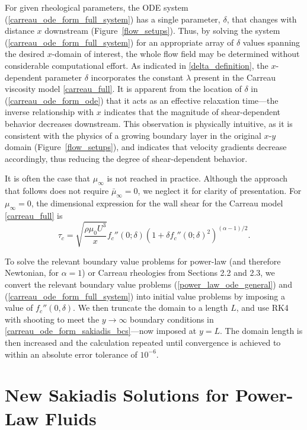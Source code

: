 \documentclass{article}
\begin{document}
For given rheological parameters, the ODE system (\ref{carreau_ode_form_full_system}) has a single parameter, $\delta$, that changes with distance $x$ downstream (Figure~\ref{flow_setups}). Thus, by solving the system (\ref{carreau_ode_form_full_system}) for an appropriate array of $\delta$ values spanning the desired $x$-domain of interest, the whole flow field may be determined without considerable computational effort. As indicated in \eqref{delta_definition}, the $x$-dependent parameter $\delta$ incorporates the constant $\lambda$ present in the Carreau viscosity model \eqref{carreau_full}.  It is apparent from the location of $\delta$ in (\ref{carreau_ode_form_ode}) that it acts as an effective relaxation time---the inverse relationship with $x$ indicates that the magnitude of shear-dependent behavior decreases downstream.  This observation is physically intuitive, as it is consistent with the physics of a growing boundary layer in the original $x$-$y$ domain (Figure~\ref{flow_setups}), and indicates that velocity gradients decrease accordingly, thus reducing the degree of shear-dependent behavior.

It is often the case that $\mu_\infty$ is not reached in practice. Although the approach that follows does not require $\bar{\mu}_\infty=0$, we neglect it for clarity of presentation. For $\mu_\infty=0$, the dimensional expression for the wall shear for the Carreau model \eqref{carreau_full} is \begin{equation}
    \tau_{c} = \sqrt{\dfrac{\rho  \mu_0U^3}{ x}}f_c''\left(0; \delta\right)\left(1 + \delta f_c''\left(0; \delta\right)^2  \right)^{(\alpha-1)/2} .\label{carreau_wall_shear_dimensional_expression}
\end{equation}

To solve the relevant boundary value problems for power-law (and therefore Newtonian, for $\alpha=1$) or Carreau rheologies from Sections 2.2 and 2.3, we convert the relevant boundary value problems (\ref{power_law_ode_general}) and (\ref{carreau_ode_form_full_system}) into initial value problems by imposing a value of $f_c''(0, \delta)$.  We then truncate the domain to a length $L$, and use RK4 with shooting to meet the $y\to\infty$ boundary conditions in \eqref{carreau_ode_form_sakiadis_bcs}---now imposed at $y=L$. The domain length is then increased and the calculation repeated until convergence is achieved to within an absolute error tolerance of $10^{-6}$.

\section{New Sakiadis Solutions for Power-Law Fluids}
\end{document}

